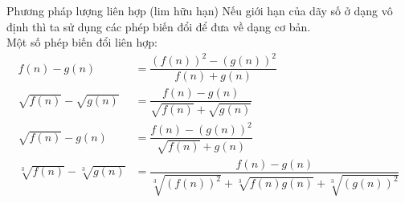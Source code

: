\begin{dang}{Phương pháp lượng liên hợp (lim hữu hạn)}
	Nếu giới hạn của dãy số ở dạng vô định thì ta sử dụng các phép biến đổi để đưa về dạng cơ bản. \\
	Một số phép biến đổi liên hợp: \\
	\begin{align*}
		f(n) - g(n) &= \dfrac{(f(n))^2 - (g(n))^2}{f(n) + g(n)} \\
		\sqrt{f(n)} - \sqrt{g(n)} &= \dfrac{f(n) - g(n)}{\sqrt{f(n)} + \sqrt{g(n)}} \\
		\sqrt{f(n)} - g(n) &= \dfrac{f(n) - (g(n))^2}{\sqrt{f(n)} + g(n)} \\
		\sqrt[3]{f(n)} - \sqrt[3]{g(n)} &= \dfrac{f(n) - g(n)}{\sqrt[3]{(f(n))^2} + \sqrt[3]{f(n)g(n)} + \sqrt[3]{(g(n))^2}}
	\end{align*}
	
\end{dang}
